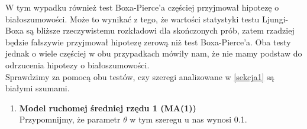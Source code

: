 \documentclass[10pt, a4paper]{article}\usepackage[]{graphicx}\usepackage[]{xcolor}
\begin{document}
W tym wypadku również test Boxa-Pierce'a częściej przyjmował hipotezę o białoszumowości. Może to wynikać z tego, że wartości statystyki testu Ljungi-Boxa są bliższe rzeczywistemu rozkładowi dla skończonych prób, zatem rzadziej będzie fałszywie przyjmował hipotezę zerową niż test Boxa-Pierce'a. Oba testy jednak o wiele częściej w obu przypadkach mówiły nam, że nie mamy podstaw do odrzucenia hipotezy o białoszumowości. \\
Sprawdzimy za pomocą obu testów, czy szeregi analizowane w \ref{sekcja1} są białymi szumami.
\begin{enumerate}
\item \textbf{Model ruchomej średniej rzędu 1 (MA(1))} \label{item1}\\
Przypomnijmy, że parametr $\theta$ w tym szeregu u nas wynosi 0.1.


\end{enumerate}
\end{document}
